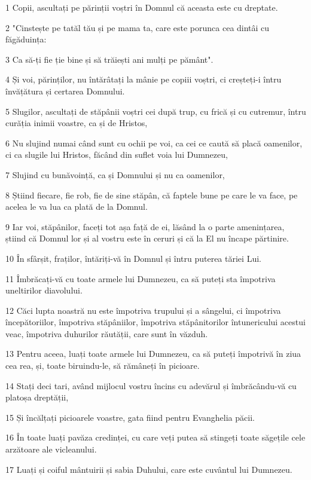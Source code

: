 \par 1 Copii, ascultați pe părinții voștri în Domnul că aceasta este cu dreptate.
\par 2 "Cinstește pe tatăl tău și pe mama ta, care este porunca cea dintâi cu făgăduința:
\par 3 Ca să-ți fie ție bine și să trăiești ani mulți pe pământ".
\par 4 Și voi, părinților, nu întărâtați la mânie pe copiii voștri, ci creșteți-i întru învățătura și certarea Domnului.
\par 5 Slugilor, ascultați de stăpânii voștri cei după trup, cu frică și cu cutremur, întru curăția inimii voastre, ca și de Hristos,
\par 6 Nu slujind numai când sunt cu ochii pe voi, ca cei ce caută să placă oamenilor, ci ca slugile lui Hristos, făcând din suflet voia lui Dumnezeu,
\par 7 Slujind cu bunăvoință, ca și Domnului și nu ca oamenilor,
\par 8 Știind fiecare, fie rob, fie de sine stăpân, că faptele bune pe care le va face, pe acelea le va lua ca plată de la Domnul.
\par 9 Iar voi, stăpânilor, faceți tot așa față de ei, lăsând la o parte amenințarea, știind că Domnul lor și al vostru este în ceruri și că la El nu încape părtinire.
\par 10 În sfârșit, fraților, întăriți-vă în Domnul și întru puterea tăriei Lui.
\par 11 Îmbrăcați-vă cu toate armele lui Dumnezeu, ca să puteți sta împotriva uneltirilor diavolului.
\par 12 Căci lupta noastră nu este împotriva trupului și a sângelui, ci împotriva începătoriilor, împotriva stăpâniilor, împotriva stăpânitorilor întunericului acestui veac, împotriva duhurilor răutății, care sunt în văzduh.
\par 13 Pentru aceea, luați toate armele lui Dumnezeu, ca să puteți împotrivă în ziua cea rea, și, toate biruindu-le, să rămâneți în picioare.
\par 14 Stați deci tari, având mijlocul vostru încins cu adevărul și îmbrăcându-vă cu platoșa dreptății,
\par 15 Și încălțați picioarele voastre, gata fiind pentru Evanghelia păcii.
\par 16 În toate luați pavăza credinței, cu care veți putea să stingeți toate săgețile cele arzătoare ale vicleanului.
\par 17 Luați și coiful mântuirii și sabia Duhului, care este cuvântul lui Dumnezeu.
